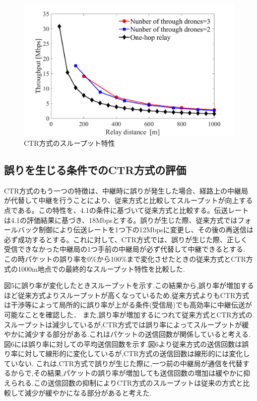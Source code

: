 \documentclass[a4paper,10.5pt]{ltjsarticle}
\begin{document}
\begin{figure}[H]
  \centering
  \includegraphics[width=\linewidth]{throughtput_vs_placement_50m_max_distance_3.pdf} %
  \caption{CTR方式のスループット特性}
  \label{fig:throughput_through} %
\end{figure}

\subsection{誤りを生じる条件でのCTR方式の評価}
CTR方式のもう一つの特徴は、中継時に誤りが発生した場合、経路上の中継局が代替して中継を行うことにより、従来方式と比較してスループットが向上する点である。この特性を、4.1の条件に基づいて従来方式と比較する。伝送レートは4.1の評価結果に基づき、18Mbpsとする。誤りが生じた際、従来方式ではフォールバック制御により伝送レートを1つ下の12Mbpsに変更し、その後の再送信は必ず成功するとする。これに対して、CTR方式では、誤りが生じた際、正しく受信できなかった中継局の1つ手前の中継局が必ず代替して中継できるとする.
この時パケットの誤り率を0\%から100\%まで変化させたときの従来方式とCTR方式の1000m地点での最終的なスループット特性を比較した.

図5に誤り率が変化したときスループットを示す.この結果から,誤り率が増加するほど従来方式よりスループットが高くなっているため,従来方式よりもCTR方式は干渉等によって局所的に誤り率が上がる条件(受信局)でも高効率に中継伝送が可能なことを確認した．
また,誤り率が増加するにつれて従来方式とCTR方式のスループットは減少しているが,CTR方式では誤り率によってスループットが緩やかに減少する部分がある.これはパケットの送信回数が関係していると考える.図6には誤り率に対しての平均送信回数を示す.図6より従来方式の送信回数は誤り率に対して線形的に変化しているが,CTR方式の送信回数は線形的には変化していない.
これは,CTR方式で誤りが生じた際に,一つ前の中継局が通信を代替するからで,その結果,パケットの誤り率が増加しても送信回数の増加は緩やかに抑えられる.この送信回数の抑制によりCTR方式のスループットは従来の方式と比較して減少が緩やかになる部分があると考えた.
\end{document}
